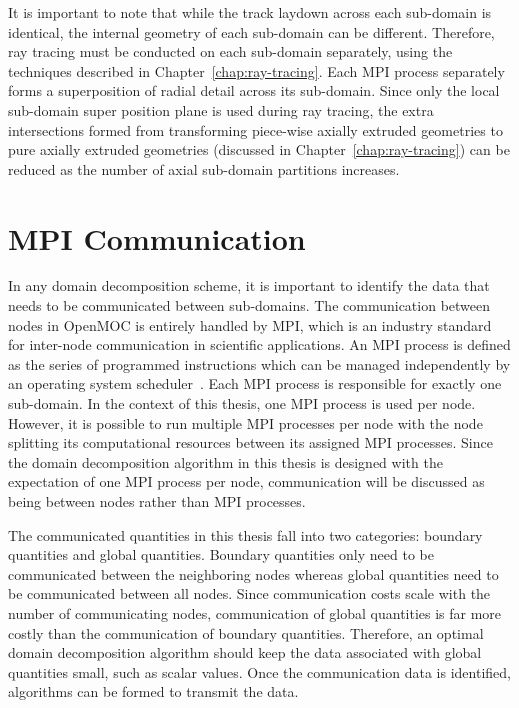 It is important to note that while the track laydown across each sub-domain is identical, the internal geometry of each sub-domain can be different. Therefore, ray tracing must be conducted on each sub-domain separately, using the techniques described in Chapter~\ref{chap:ray-tracing}. Each \ac{MPI} process separately forms a superposition of radial detail across its sub-domain. Since only the local sub-domain super position plane is used during ray tracing, the extra intersections formed from transforming piece-wise axially extruded geometries to pure axially extruded geometries (discussed in Chapter~\ref{chap:ray-tracing}) can be reduced as the number of axial sub-domain partitions increases.

\section{MPI Communication}
\label{sec:mpi}

In any domain decomposition scheme, it is important to identify the data that needs to be communicated between sub-domains. The communication between nodes in OpenMOC is entirely handled by \ac{MPI}, which is an industry standard for inter-node communication in scientific applications. An \ac{MPI} process is defined as the series of programmed instructions which can be managed independently by an operating system scheduler~\cite{lamport}. Each \ac{MPI} process is responsible for exactly one sub-domain. In the context of this thesis, one \ac{MPI} process is used per node. However, it is possible to run multiple \ac{MPI} processes per node with the node splitting its computational resources between its assigned \ac{MPI} processes. Since the domain decomposition algorithm in this thesis is designed with the expectation of one \ac{MPI} process per node, communication will be discussed as being between nodes rather than \ac{MPI} processes.

The communicated quantities in this thesis fall into two categories: boundary quantities and global quantities. Boundary quantities only need to be communicated between the neighboring nodes whereas global quantities need to be communicated between all nodes. Since communication costs scale with the number of communicating nodes, communication of global quantities is far more costly than the communication of boundary quantities. Therefore, an optimal domain decomposition algorithm should keep the data associated with global quantities small, such as scalar values. Once the communication data is identified, algorithms can be formed to transmit the data. 

